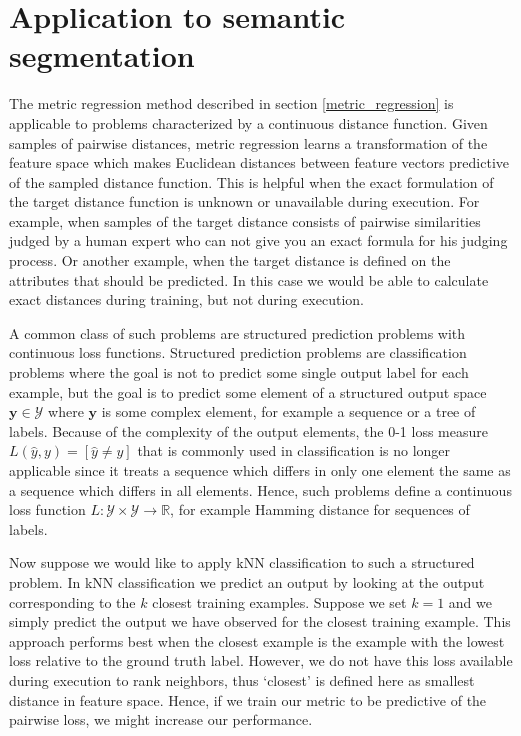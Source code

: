 \documentclass[a4paper,titlepage]{article}
\renewcommand{\vec}[1]{\mathbf{#1}}
\begin{document}
%

\pagebreak
\section{Application to semantic segmentation}

The metric regression method described in section \ref{metric_regression} is applicable to problems characterized by a continuous distance function. Given samples of pairwise distances, metric regression learns a transformation of the feature space which makes Euclidean distances between feature vectors predictive of the sampled distance function. This is helpful when the exact formulation of the target distance function is unknown or unavailable during execution. For example, when samples of the target distance consists of pairwise similarities judged by a human expert who can not give you an exact formula for his judging process. Or another example, when the target distance is defined on the attributes that should be predicted. In this case we would be able to calculate exact distances during training, but not during execution.

A common class of such problems are structured prediction problems with continuous loss functions. Structured prediction problems are classification problems where the goal is not to predict some single output label for each example, but the goal is to predict some element of a structured output space $\vec{y} \in \mathcal{Y}$ where $\vec{y}$ is some complex element, for example a sequence or a tree of labels. Because of the complexity of the output elements, the 0-1 loss measure $L(\hat{y}, y) = \left[\hat{y} \ne y\right]$ that is commonly used in classification is no longer applicable since it treats a sequence which differs in only one element the same as a sequence which differs in all elements. Hence, such problems define a continuous loss function $L: \mathcal{Y} \times \mathcal{Y} \rightarrow \mathbb{R}$, for example Hamming distance for sequences of labels.

Now suppose we would like to apply \acf{kNN} classification to such a structured problem. In \ac{kNN} classification we predict an output by looking at the output corresponding to the $k$ closest training examples. Suppose we set $k = 1$ and we simply predict the output we have observed for the closest training example. This approach performs best when the closest example is the example with the lowest loss relative to the ground truth label. However, we do not have this loss available during execution to rank neighbors, thus `closest' is defined here as smallest distance in feature space. Hence, if we train our metric to be predictive of the pairwise loss, we might increase our performance.
\end{document}
